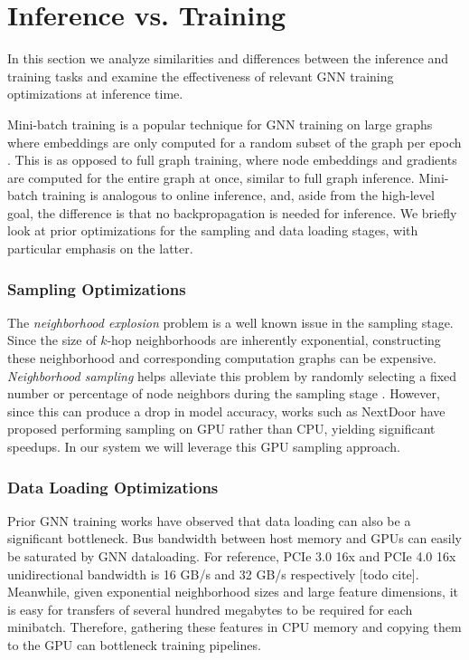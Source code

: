 \section{Inference vs. Training} \label{Background: Relation to training}
In this section we analyze similarities and differences between the inference and training tasks and examine the effectiveness of relevant GNN training optimizations at inference time.

Mini-batch training is a popular technique for GNN training on large graphs where embeddings are only computed for a random subset of the graph per epoch \cite{BGL_2023}. 
This is as opposed to full graph training, where node embeddings and gradients are computed for the entire graph at once, similar to full graph inference.
Mini-batch training is analogous to online inference, and, aside from the high-level goal, the difference is that no backpropagation is needed for inference. We briefly look at prior optimizations for the sampling and data loading stages, with particular emphasis on the latter.

\subsubsection{Sampling Optimizations}
The \textit{neighborhood explosion} problem is a well known issue in the sampling stage.
Since the size of $k$-hop neighborhoods are inherently exponential, constructing these neighborhood and corresponding computation graphs can be expensive. \textit{Neighborhood sampling} helps alleviate this problem by randomly selecting a fixed number or percentage of node neighbors during the sampling stage \cite{GraphSAGE_2017}. 
However, since this can produce a drop in model accuracy, works such as NextDoor \cite{NextDoor_2021} have proposed performing sampling on GPU rather than CPU, yielding significant speedups.
In our system we will leverage this GPU sampling approach.

\subsubsection{Data Loading Optimizations}

Prior GNN training works have observed that data loading can also be a significant bottleneck.
Bus bandwidth between host memory and GPUs can easily be saturated by GNN dataloading. 
For reference, PCIe 3.0 16x and PCIe 4.0 16x unidirectional bandwidth is 16 GB/s and 32 GB/s respectively [todo cite].
Meanwhile, given exponential neighborhood sizes and large feature dimensions, it is easy for transfers of several hundred megabytes to be required for each minibatch.
Therefore, gathering these features in CPU memory and copying them to the GPU can bottleneck training pipelines.


